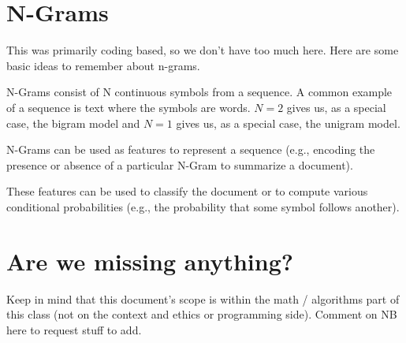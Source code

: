 \documentclass{tufte-handout}
\begin{document}
\ei



\section{N-Grams}
This was primarily coding based, so we don't have too much here.  Here are some basic ideas to remember about n-grams.

\bi
\item N-Grams consist of N continuous symbols from a sequence.  A common example of a sequence is text where the symbols are words.  $N=2$ gives us, as a special case, the bigram model and $N=1$ gives us, as a special case, the unigram model.
\item N-Grams can be used as features to represent a sequence (e.g., encoding the presence or absence of a particular N-Gram to summarize a document).
\item These features can be used to classify the document or to compute various conditional probabilities (e.g., the probability that some symbol follows another).
\ei

\section{Are we missing anything?}
Keep in mind that this document's scope is within the math / algorithms part of this class (not on the context and ethics or programming side).  Comment on NB here to request stuff to add. 
\end{document}

